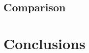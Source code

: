 \documentclass[twoside]{article}
\begin{document}
\begin{multicols}{2}
\subsection{Comparison}

\section{Conclusions}
\label{concl}

\label{references}
\printbibliography


\end{multicols}
\end{document}
